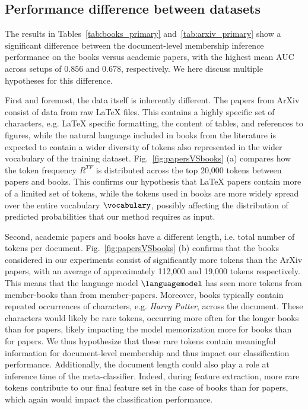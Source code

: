 \documentclass[twocolumn,10pt]{article}
\begin{document}
\subsection{Performance difference between datasets}

The results in Tables~\ref{tab:books_primary} and~\ref{tab:arxiv_primary} show a significant difference between the document-level membership inference performance on the books versus academic papers, with the highest mean AUC across setups of $0.856$ and $0.678$, respectively. We here discuss multiple hypotheses for this difference. 

First and foremost, the data itself is inherently different. The papers from ArXiv consist of data from raw LaTeX files. This contains a highly specific set of characters, e.g. LaTeX specific formatting, the content of tables, and references to figures, while the natural language included in books from the literature is expected to contain a wider diversity of tokens also represented in the wider vocabulary of the training dataset. Fig.~\ref{fig:papersVSbooks} (a) compares how the token frequency $R^{TF}$ is distributed across the top 20,000 tokens between papers and books. This confirms our hypothesis that LaTeX papers contain more of a limited set of tokens, while the tokens used in books are more widely spread over the entire vocabulary $\vocabulary$, possibly affecting the distribution of predicted probabilities that our method requires as input.

Second, academic papers and books have a different length, i.e. total number of tokens per document. Fig.~\ref{fig:papersVSbooks} (b) confirms that the books considered in our experiments consist of significantly more tokens than the ArXiv papers, with an average of approximately 112,000 and 19,000 tokens respectively. 
This means that the language model $\languagemodel$ has seen more tokens from member-books than from member-papers. Moreover, books typically contain repeated occurrences of characters, e.g. \emph{Harry Potter}, across the document. These characters would likely be rare tokens, occurring more often for the longer books than for papers, likely impacting the model memorization more for books than for papers. We thus hypothesize that these rare tokens contain meaningful information for document-level membership and thus impact our classification performance. Additionally, the document length could also play a role at inference time of the meta-classifier. Indeed, during feature extraction, more rare tokens contribute to our final feature set in the case of books than for papers, which again would impact the classification performance. 
\end{document}
